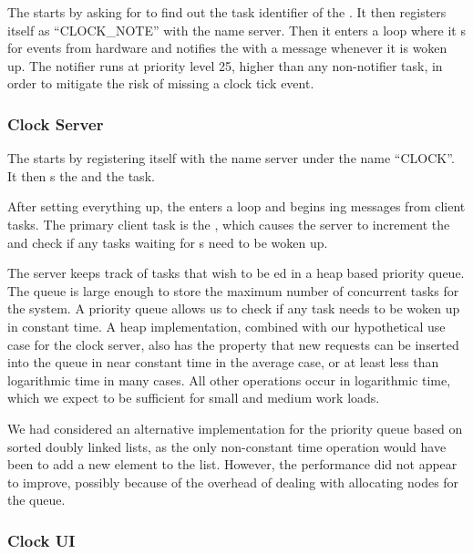 \documentclass[pdftex,10pt,a4paper]{article}
\begin{document}
The  starts by asking for  to
find out the task identifier of the . It then
registers itself as ``CLOCK\_NOTE'' with the name server.
Then it enters a  loop where it s for
 events from hardware and notifies the
 with a  message whenever it
is woken up. The notifier runs at priority level 25, higher than any
non-notifier task, in order to mitigate the risk of missing a clock
tick event.

\subsubsection*{Clock Server}

The  starts by registering itself with the name
server under the name ``CLOCK''. It then s the
 and the  task.

After setting everything up, the  enters a
 loop and begins ing messages from client
tasks. The primary client task is the , which
causes the server to increment the  and check if any tasks
waiting for s need to be woken up.

The server keeps track of tasks that wish to be ed in a
heap based priority queue. The queue is large enough to store the
maximum number of concurrent tasks for the system. A priority queue
allows us to check if any task needs to be woken up in constant
time. A heap implementation, combined with our hypothetical use case
for the clock server, also has the property that new 
requests can be inserted into the queue in near constant time in the
average case, or at least less than logarithmic time in many
cases. All other operations occur in logarithmic time, which we expect
to be sufficient for small and medium work loads.

We had considered an alternative implementation for the priority queue
based on sorted doubly linked lists, as the only non-constant time
operation would have been to add a new element to the list. However,
the performance did not appear to improve, possibly because of the
overhead of dealing with allocating nodes for the queue.

\subsubsection*{Clock UI}
\end{document}
